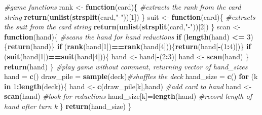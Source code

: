 \documentclass[
]{book}
\newenvironment{Shaded}{\begin{snugshade}}{\end{snugshade}}
\newcommand{\CommentTok}[1]{\textcolor[rgb]{0.56,0.35,0.01}{\textit{#1}}}
\newcommand{\ControlFlowTok}[1]{\textcolor[rgb]{0.13,0.29,0.53}{\textbf{#1}}}
\newcommand{\DecValTok}[1]{\textcolor[rgb]{0.00,0.00,0.81}{#1}}
\newcommand{\FunctionTok}[1]{\textcolor[rgb]{0.13,0.29,0.53}{\textbf{#1}}}
\newcommand{\NormalTok}[1]{#1}
\newcommand{\OtherTok}[1]{\textcolor[rgb]{0.56,0.35,0.01}{#1}}
\newcommand{\SpecialCharTok}[1]{\textcolor[rgb]{0.81,0.36,0.00}{\textbf{#1}}}
\newcommand{\StringTok}[1]{\textcolor[rgb]{0.31,0.60,0.02}{#1}}
\theoremstyle{definition}
\theoremstyle{definition}
\theoremstyle{definition}
\theoremstyle{definition}
\theoremstyle{remark}
\begin{document}
\begin{Shaded}
\begin{Highlighting}[]
  \CommentTok{\#game functions}
\NormalTok{  rank }\OtherTok{\textless{}{-}} \ControlFlowTok{function}\NormalTok{(card)\{ }\CommentTok{\#extracts the rank from the card string}
    \FunctionTok{return}\NormalTok{(}\FunctionTok{unlist}\NormalTok{(}\FunctionTok{strsplit}\NormalTok{(card,}\StringTok{"{-}"}\NormalTok{))[}\DecValTok{1}\NormalTok{])}
\NormalTok{    \}}
\NormalTok{  suit }\OtherTok{\textless{}{-}} \ControlFlowTok{function}\NormalTok{(card)\{ }\CommentTok{\#extracts the suit from the card string}
    \FunctionTok{return}\NormalTok{(}\FunctionTok{unlist}\NormalTok{(}\FunctionTok{strsplit}\NormalTok{(card,}\StringTok{"{-}"}\NormalTok{))[}\DecValTok{2}\NormalTok{])}
\NormalTok{    \}}
\NormalTok{  scan }\OtherTok{\textless{}{-}} \ControlFlowTok{function}\NormalTok{(hand)\{ }\CommentTok{\#scans the hand for hand reductions}
    \ControlFlowTok{if}\NormalTok{ (}\FunctionTok{length}\NormalTok{(hand) }\SpecialCharTok{\textless{}=} \DecValTok{3}\NormalTok{)\{}\FunctionTok{return}\NormalTok{(hand)\}}
    \ControlFlowTok{if}\NormalTok{ (}\FunctionTok{rank}\NormalTok{(hand[}\DecValTok{1}\NormalTok{])}\SpecialCharTok{==}\FunctionTok{rank}\NormalTok{(hand[}\DecValTok{4}\NormalTok{]))\{}\FunctionTok{return}\NormalTok{(hand[}\SpecialCharTok{{-}}\NormalTok{(}\DecValTok{1}\SpecialCharTok{:}\DecValTok{4}\NormalTok{)])\}}
    \ControlFlowTok{if}\NormalTok{ (}\FunctionTok{suit}\NormalTok{(hand[}\DecValTok{1}\NormalTok{])}\SpecialCharTok{==}\FunctionTok{suit}\NormalTok{(hand[}\DecValTok{4}\NormalTok{]))\{}
\NormalTok{      hand }\OtherTok{\textless{}{-}}\NormalTok{ hand[}\SpecialCharTok{{-}}\NormalTok{(}\DecValTok{2}\SpecialCharTok{:}\DecValTok{3}\NormalTok{)]}
\NormalTok{      hand }\OtherTok{\textless{}{-}} \FunctionTok{scan}\NormalTok{(hand)}
\NormalTok{      \}}
    \FunctionTok{return}\NormalTok{(hand)}
\NormalTok{    \}}
  \CommentTok{\#play game without comment, returning vector of hand\_sizes}
\NormalTok{  hand }\OtherTok{=} \FunctionTok{c}\NormalTok{()}
\NormalTok{  draw\_pile }\OtherTok{=} \FunctionTok{sample}\NormalTok{(deck)}\CommentTok{\#shuffles the deck}
\NormalTok{  hand\_size }\OtherTok{=} \FunctionTok{c}\NormalTok{()}
  \ControlFlowTok{for}\NormalTok{ (k }\ControlFlowTok{in} \DecValTok{1}\SpecialCharTok{:}\FunctionTok{length}\NormalTok{(deck))\{}
\NormalTok{    hand }\OtherTok{\textless{}{-}} \FunctionTok{c}\NormalTok{(draw\_pile[k],hand) }\CommentTok{\#add card to hand}
\NormalTok{    hand }\OtherTok{\textless{}{-}} \FunctionTok{scan}\NormalTok{(hand) }\CommentTok{\#look for reductions}
\NormalTok{    hand\_size[k]}\OtherTok{=}\FunctionTok{length}\NormalTok{(hand) }\CommentTok{\#record length of hand after turn k}
\NormalTok{    \}}
  \FunctionTok{return}\NormalTok{(hand\_size)}
\NormalTok{\}}
\end{Highlighting}
\end{Shaded}
\end{document}
